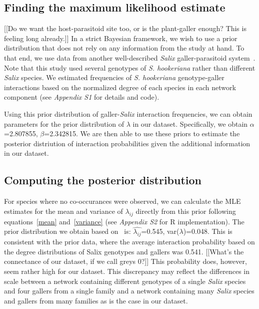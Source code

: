 \documentclass[12pt]{article}
\begin{document}
    \subsection*{Finding the maximum likelihood estimate}

      [[Do we want the host-parasitoid site too, or is the plant-galler enough? This is feeling long already.]]
      In a strict Bayesian framework, we wish to use a prior distribution that does not rely on any information from the study at hand. To that end, we use data from another well-described \emph{Salix} galler-parasitoid system~\citep{Barbour2016,Barbour2016Dryad}. Note that this study used several genotypes of \emph{S. hookeriana} rather than different \emph{Salix} species. We estimated frequencies of  \emph{S. hookeriana} genotype-galler interactions based on the normalized degree of each species in each network component (see \emph{Appendix S1} for details and code).


      Using this prior distribution of galler-\emph{Salix} interaction frequencies, we can obtain parameters for the prior distribution of $\lambda$ in our dataset. Specifically, we obtain $\alpha$=2.807855, $\beta$=2.342815. We are then able to use these priors to estimate the posterior distriution of interaction probabilities given the additional information in our dataset.


    \subsection*{Computing the posterior distribution}

      For species where no co-occurances were observed, we can 
      calculate the MLE estimates for the mean and variance of 
      $\lambda_{ij}$ directly from this prior following 
      equations~\ref{mean} and~\ref{variance} 
      (see \emph{Appendix S2} for R implementation). The prior 
      distribution we obtain based on~\citet{Barbour2016,Barbour2016Dryad} is:
      $\hat{\lambda_{ij}}$=0.545, var($\lambda$)=0.048.
      This is consistent with the prior data, where the average 
      interaction probability based on the degree distributions of Salix genotypes and gallers was 0.541. [[What's the connectance of our dataset, if we call greys 0?]] This probability does, however, seem rather high for our dataset. This discrepancy may reflect the differences in scale between a network containing different genotypes of a single \emph{Salix} species and four gallers from a single family and a network containing many \emph{Salix} species and gallers from many families as is the case in our dataset.
\end{document}
